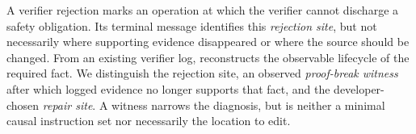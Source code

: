 

% 




A verifier rejection marks an operation at which the verifier cannot discharge a safety obligation. Its terminal message identifies this \emph{rejection site}, but not necessarily where supporting evidence disappeared or where the source should be changed. From an existing verifier log, \sys reconstructs the observable lifecycle of the required fact. We distinguish the rejection site, an observed \emph{proof-break witness} after which logged evidence no longer supports that fact, and the developer-chosen \emph{repair site}. A witness narrows the diagnosis, but is neither a minimal causal instruction set nor necessarily the location to edit.

